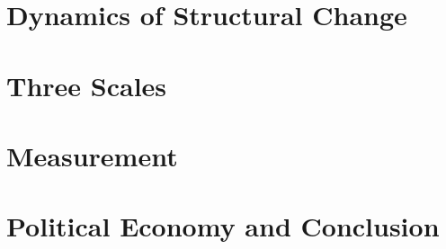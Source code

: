\documentclass[12pt,a4paper,openright,twoside]{book}
\begin{document}
\part{Dynamics of Structural Change}




\part{Three Scales}





\part{Measurement}





\part{Political Economy and Conclusion}







\backmatter

\cleardoublepage
{}
{}

\end{document}
